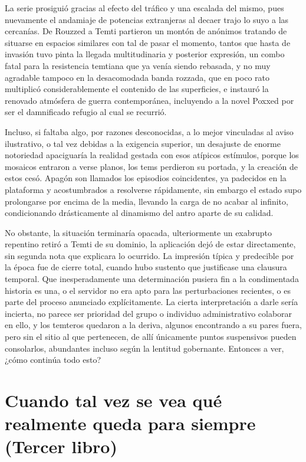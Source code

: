 \documentclass[
]{book}
\begin{document}
La serie prosiguió gracias al efecto del tráfico y una escalada del mismo, pues nuevamente el andamiaje de potencias extranjeras al decaer trajo lo suyo a las cercanías. De Rouzzed a Temti partieron un montón de anónimos tratando de situarse en espacios similares con tal de pasar el momento, tantos que hasta de invasión tuvo pinta la llegada multitudinaria y posterior expresión, un combo fatal para la resistencia temtiana que ya venía siendo rebasada, y no muy agradable tampoco en la desacomodada banda rozzada, que en poco rato multiplicó considerablemente el contenido de las superficies, e instauró la renovado atmósfera de guerra contemporánea, incluyendo a la novel Poxxed por ser el damnificado refugio al cual se recurrió.

Incluso, si faltaba algo, por razones desconocidas, a lo mejor vinculadas al aviso ilustrativo, o tal vez debidas a la exigencia superior, un desajuste de enorme notoriedad apaciguaría la realidad gestada con esos atípicos estímulos, porque los mosaicos entraron a verse planos, los tems perdieron su portada, y la creación de estos cesó. Apagón son llamados los episodios coincidentes, ya padecidos en la plataforma y acostumbrados a resolverse rápidamente, sin embargo el estado supo prolongarse por encima de la media, llevando la carga de no acabar al infinito, condicionando drásticamente al dinamismo del antro aparte de su calidad.

No obstante, la situación terminaría opacada, ulteriormente un exabrupto repentino retiró a Temti de su dominio, la aplicación dejó de estar directamente, sin segunda nota que explicara lo ocurrido. La impresión típica y predecible por la época fue de cierre total, cuando hubo sustento que justificase una clausura temporal. Que inesperadamente una determinación pusiera fin a la condimentada historia es una, o el servidor no era apto para las perturbaciones recientes, o es parte del proceso anunciado explícitamente. La cierta interpretación a darle sería incierta, no parece ser prioridad del grupo o individuo administrativo colaborar en ello, y los temteros quedaron a la deriva, algunos encontrando a su pares fuera, pero sin el sitio al que pertenecen, de allí únicamente puntos suspensivos pueden consolarlos, abundantes incluso según la lentitud gobernante. Entonces a ver, ¿cómo continúa todo esto?

\hypertarget{cuando-tal-vez-se-vea-quuxe9-realmente-queda-para-siempre-tercer-libro}{%
\chapter{Cuando tal vez se vea qué realmente queda para siempre (Tercer libro)}\label{cuando-tal-vez-se-vea-quuxe9-realmente-queda-para-siempre-tercer-libro}}
\end{document}
